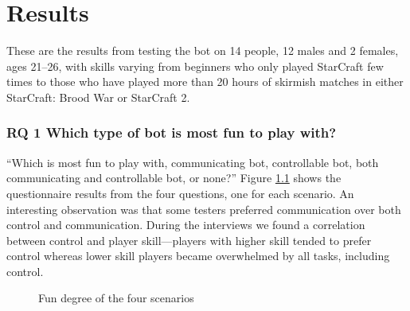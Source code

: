 \chapter{Results}
These are the results from testing the bot on 14 people, 12 males and 2 females, ages 21–26, with
skills varying from beginners who only played StarCraft few times to those who have played more
than 20 hours of skirmish matches in either StarCraft: Brood War or StarCraft 2.

\subsection{RQ 1 Which type of bot is most fun to play with?}
``Which is most fun to play with, communicating bot, controllable bot, both communicating and
controllable bot, or none?'' Figure \ref{fig:results_fun} shows the questionnaire results from the
four questions, one for each scenario. An interesting observation was that some testers preferred
communication over both control and communication. During the interviews we found a correlation
between control and player skill—players with higher skill tended to prefer control whereas lower
skill players became overwhelmed by all tasks, including control.

\begin{figure}[htb]
\caption{Fun degree of the four scenarios}
\label{fig:results_fun}
\end{figure}


